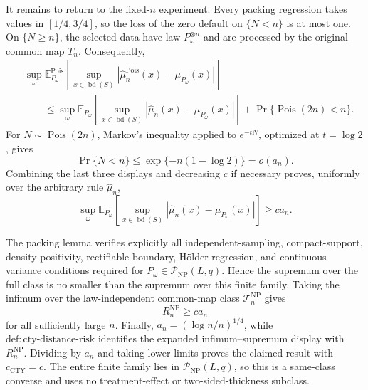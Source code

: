 It remains to return to the fixed-\(n\) experiment.  Every packing regression takes values in \([1/4,3/4]\), so the loss of the zero default on \(\{N<n\}\) is at most one.  On \(\{N\geq n\}\), the selected data have law \(P_\omega^{\otimes n}\) and are processed by the original common map \(T_n\).  Consequently,
\[
\begin{aligned}
 &\sup_\omega
 \mathbb E_{P_\omega}^{\mathrm{Pois}}\!\left[
 \sup_{x\in\operatorname{bd}(S)}
 |\widehat\mu_n^{\mathrm{Pois}}(x)-\mu_{P_\omega}(x)|
 \right]\\
 &\qquad\leq
 \sup_\omega
 \mathbb E_{P_\omega}\!\left[
 \sup_{x\in\operatorname{bd}(S)}
 |\widehat\mu_n(x)-\mu_{P_\omega}(x)|
 \right]
 +\Pr\{\operatorname{Pois}(2n)<n\}.
\end{aligned}
\]
For \(N\sim\operatorname{Pois}(2n)\), Markov's inequality applied to \(e^{-tN}\), optimized at \(t=\log2\), gives
\[
 \Pr\{N<n\}
 \leq\exp\{-n(1-\log2)\}=o(a_n).
\]
Combining the last three displays and decreasing \(c\) if necessary proves, uniformly over the arbitrary rule \(\widehat\mu_n\),
\[
 \sup_\omega
 \mathbb E_{P_\omega}\!\left[
 \sup_{x\in\operatorname{bd}(S)}
 |\widehat\mu_n(x)-\mu_{P_\omega}(x)|
 \right]
 \geq c a_n.
\]

The packing lemma verifies explicitly all independent-sampling, compact-support, density-positivity, rectifiable-boundary, H\"older-regression, and continuous-variance conditions required for \(P_\omega\in\mathcal P_{\mathrm{NP}}(L,q)\).  Hence the supremum over the full class is no smaller than the supremum over this finite family.  Taking the infimum over the law-independent common-map class \(\mathcal T_n^{\mathrm{NP}}\) gives
\[
 R_n^{\mathrm{NP}}\geq c a_n
\]
for all sufficiently large \(n\).  Finally, \(a_n=(\log n/n)^{1/4}\), while \(\mathrm{def:cty\text{-}distance\text{-}risk}\) identifies the expanded infimum--supremum display with \(R_n^{\mathrm{NP}}\).  Dividing by \(a_n\) and taking lower limits proves the claimed result with \(c_{\mathrm{CTY}}=c\).  The entire finite family lies in \(\mathcal P_{\mathrm{NP}}(L,q)\), so this is a same-class converse and uses no treatment-effect or two-sided-thickness subclass.